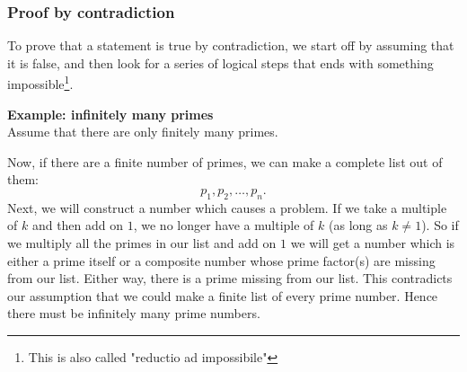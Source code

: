 \documentclass[10pt, a4paper]{article}
\begin{document}
\subsubsection{Proof by contradiction}
To prove that a statement is true by contradiction, we start off by assuming that it is false, and then look for a series of logical steps that ends with something impossible\footnote{This is also called "reductio ad impossibile"}.

\textbf{Example: infinitely many primes} \\
Assume that there are only finitely many primes.

Now, if there are a finite number of primes, we can make a complete list out of them:
\[
p_1, p_2, \dotsc, p_n.
\]
Next, we will construct a number which causes a problem. If we take a multiple of $k$ and then add on $1$, we no longer have a multiple of $k$ (as long as $k \neq 1$). So if we multiply all the primes in our list and add on $1$ we will get a number which is either a prime itself or a composite number whose prime factor(s) are missing from our list. Either way, there is a prime missing from our list. This contradicts our assumption that we could make a finite list of every prime number. Hence there must be infinitely many prime numbers.
\end{document}
